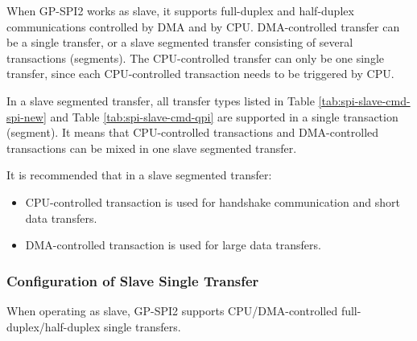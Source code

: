\documentclass[main\_\_EN.tex]{subfiles}
\begin{document}
When GP-SPI2 works as slave, it supports full-duplex and half-duplex communications controlled by DMA and by CPU. DMA-controlled transfer can be a single transfer, or a slave segmented transfer consisting of several transactions (segments). The CPU-controlled transfer can only be one single transfer, since each CPU-controlled transaction needs to be triggered by CPU.

In a slave segmented transfer, all transfer types listed in Table \ref{tab:spi-slave-cmd-spi-new} and Table \ref{tab:spi-slave-cmd-qpi} are supported in a single transaction (segment). It means that CPU-controlled transactions and DMA-controlled transactions can be mixed in one slave segmented transfer.

It is recommended that in a slave segmented transfer:

\begin{itemize}
    \item CPU-controlled transaction is used for handshake communication and short data transfers.
    \item DMA-controlled transaction is used for large data transfers.
\end{itemize}


\subsubsection{Configuration of Slave Single Transfer}\label{GP-SPI2 slave single transfer}

When operating as slave, GP-SPI2 supports CPU/DMA-controlled full-duplex/half-duplex single transfers.
\end{document}
